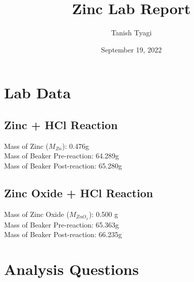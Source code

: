 \documentclass{article}
\title{\textbf{Zinc Lab Report}}
\author{Tanish Tyagi}
\date{September 19, 2022}
\begin{document}
\maketitle

\section{Lab Data}

\subsection{Zinc + HCl Reaction}
Mass of Zinc ($M_{Zn}$): 0.476g \\ 
Mass of Beaker Pre-reaction: 64.289g \\ 
Mass of Beaker Post-reaction: 65.280g

\subsection{Zinc Oxide + HCl Reaction}
Mass of Zinc Oxide ($M_{ZnO_{x}}$): 0.500 g \\
Mass of Beaker Pre-reaction: 65.363g  \\
Mass of Beaker Post-reaction: 66.235g

\section{Analysis Questions}
\end{document}
